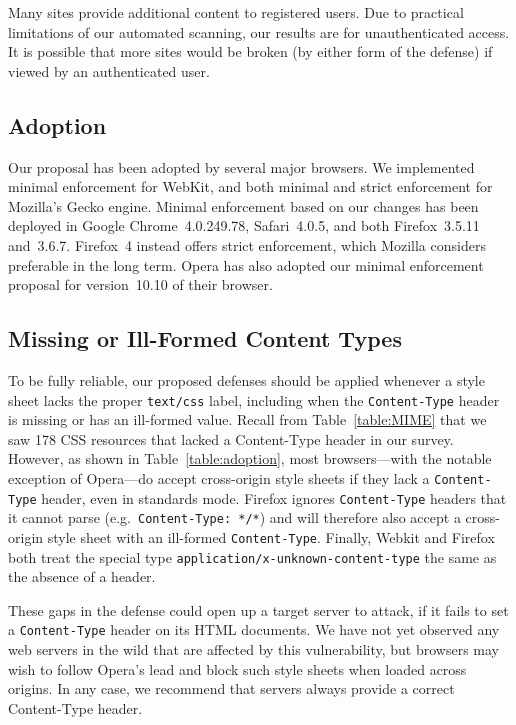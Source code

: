 \documentclass{sig-alternate}
\begin{document}
Many sites provide additional content to registered users. Due
to practical limitations of our automated scanning, our results
are for unauthenticated access. It is possible that more sites
would be broken (by either form of the defense) if viewed by an
authenticated user.

\subsection{Adoption}
Our proposal has been adopted by several major browsers. We
implemented minimal enforcement for WebKit, and both minimal and
strict enforcement for Mozilla's Gecko engine. Minimal enforcement
based on our changes has been deployed in Google Chrome~4.0.249.78,
Safari~4.0.5, and both Firefox~3.5.11 and~3.6.7. Firefox~4 instead
offers strict enforcement, which Mozilla considers preferable in the
long term. Opera has also adopted our minimal enforcement proposal
for version~10.10 of their browser.

\subsection{Missing or Ill-Formed Content Types}\label{sec:missing}
To be fully reliable, our proposed defenses should be applied whenever
a style sheet lacks the proper \verb|text/css| label, including
when the \texttt{Content-Type} header is missing or has an ill-formed
value.  Recall from Table~\ref{table:MIME} that we saw 178 CSS
resources that lacked a Content-Type header in our survey.  However,
as shown in Table~\ref{table:adoption}, most browsers---with the
notable exception of Opera---do accept cross-origin style sheets if
they lack a \texttt{Content-Type} header, even in standards mode.
Firefox ignores \texttt{Content-Type} headers that it cannot parse
(e.g.~\verb|Content-Type: */*|) and will therefore also accept a
cross-origin style sheet with an ill-formed \texttt{Content-Type}.
Finally, Webkit and Firefox both treat the special type
\texttt{application/x-unknown-content-type} the same as the absence of
a header.

These gaps in the defense could open up a target server to attack, if
it fails to set a \texttt{Content-Type} header on its HTML
documents. We have not yet observed any web servers in the wild that
are affected by this vulnerability, but browsers may wish to follow
Opera's lead and block such style sheets when loaded across
origins. In any case, we recommend that servers always provide a
correct Content-Type header.
\end{document}
